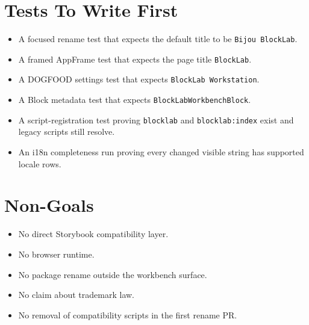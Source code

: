 \section{Tests To Write First}\label{record-134-tests-to-write-first}

\begin{itemize}
\tightlist
\item
  A focused rename test that expects the default title to be \texttt{B\allowbreak{}i\allowbreak{}j\allowbreak{}o\allowbreak{}u\allowbreak{} \allowbreak{}B\allowbreak{}l\allowbreak{}o\allowbreak{}c\allowbreak{}k\allowbreak{}L\allowbreak{}a\allowbreak{}b}.
\item
  A framed AppFrame test that expects the page title \texttt{B\allowbreak{}l\allowbreak{}o\allowbreak{}c\allowbreak{}k\allowbreak{}L\allowbreak{}a\allowbreak{}b}.
\item
  A DOGFOOD settings test that expects \texttt{B\allowbreak{}l\allowbreak{}o\allowbreak{}c\allowbreak{}k\allowbreak{}L\allowbreak{}a\allowbreak{}b\allowbreak{} \allowbreak{}W\allowbreak{}o\allowbreak{}r\allowbreak{}k\allowbreak{}s\allowbreak{}t\allowbreak{}a\allowbreak{}t\allowbreak{}i\allowbreak{}o\allowbreak{}n}.
\item
  A Block metadata test that expects \texttt{B\allowbreak{}l\allowbreak{}o\allowbreak{}c\allowbreak{}k\allowbreak{}L\allowbreak{}a\allowbreak{}b\allowbreak{}W\allowbreak{}o\allowbreak{}r\allowbreak{}k\allowbreak{}b\allowbreak{}e\allowbreak{}n\allowbreak{}c\allowbreak{}h\allowbreak{}B\allowbreak{}l\allowbreak{}o\allowbreak{}c\allowbreak{}k}.
\item
  A script-registration test proving \texttt{b\allowbreak{}l\allowbreak{}o\allowbreak{}c\allowbreak{}k\allowbreak{}l\allowbreak{}a\allowbreak{}b} and \texttt{b\allowbreak{}l\allowbreak{}o\allowbreak{}c\allowbreak{}k\allowbreak{}l\allowbreak{}a\allowbreak{}b\allowbreak{}:\allowbreak{}i\allowbreak{}n\allowbreak{}d\allowbreak{}e\allowbreak{}x} exist and legacy scripts still resolve.
\item
  An i18n completeness run proving every changed visible string has supported locale rows.
\end{itemize}

\section{Non-Goals}\label{record-134-non-goals}

\begin{itemize}
\tightlist
\item
  No direct Storybook compatibility layer.
\item
  No browser runtime.
\item
  No package rename outside the workbench surface.
\item
  No claim about trademark law.
\item
  No removal of compatibility scripts in the first rename PR.
\end{itemize}


